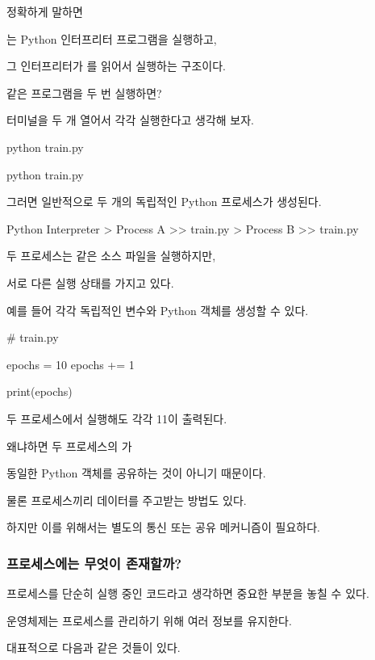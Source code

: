 정확하게 말하면

는 Python 인터프리터 프로그램을 실행하고,

그 인터프리터가 를 읽어서 실행하는 구조이다.

같은 프로그램을 두 번 실행하면?

터미널을 두 개 열어서 각각 실행한다고 생각해 보자.

\begin{dhkzsh}
python train.py
\end{dhkzsh}

\begin{dhkzsh}
python train.py
\end{dhkzsh}

그러면 일반적으로 두 개의 독립적인 Python 프로세스가 생성된다.

\begin{dhkdir}
Python Interpreter
> Process A
>> train.py
> Process B
>> train.py
\end{dhkdir}

두 프로세스는 같은 소스 파일을 실행하지만,

서로 다른 실행 상태를 가지고 있다.

예를 들어 각각 독립적인 변수와 Python 객체를 생성할 수 있다.

\begin{dhkcode}
# train.py

epochs = 10
epochs += 1

print(epochs)
\end{dhkcode}

두 프로세스에서 실행해도 각각 11이 출력된다.

왜냐하면 두 프로세스의 가

동일한 Python 객체를 공유하는 것이 아니기 때문이다.

물론 프로세스끼리 데이터를 주고받는 방법도 있다.

하지만 이를 위해서는 별도의 통신 또는 공유 메커니즘이 필요하다.

\subsubsection{프로세스에는 무엇이 존재할까?}

프로세스를 단순히 실행 중인 코드라고 생각하면 중요한 부분을 놓칠 수 있다.

운영체제는 프로세스를 관리하기 위해 여러 정보를 유지한다.

대표적으로 다음과 같은 것들이 있다.

